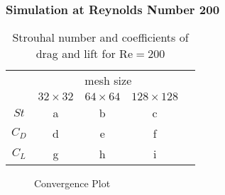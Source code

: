	\subsubsection{Simulation at Reynolds Number 200}
			\begin{table}[htp]
				\centering
				\begin{tabular}{|c||c|c|c|c}
					\cline{1-4}
					\rule{0pt}{2,3ex}\multirow{2}{*}{}   & \multicolumn{3}{c|}{mesh size} &  \\ \cline{2-4}
					\rule{0pt}{2,3ex}& $32 \times 32$       & $64 \times 64$       & $128 \times 128$      &  \\ \cline{1-4}
					\rule{0pt}{2,3ex}$St$ 				 & a        & b        & c        &  \\ \cline{1-4}
					\rule{0pt}{2,3ex}$C_D$                & d        & e        & f        &  \\ \cline{1-4}
					\rule{0pt}{2,3ex}$C_L$                & g        & h        & i        &  \\ \cline{1-4}
				\end{tabular}
				\caption{Strouhal number and coefficients of drag and lift for $\text{Re}=200$}
				\label{tab:re200}
			\end{table}
			\begin{figure}[htp]	
				\centering
				\label{shijfterdaror}	
				\caption{Convergence Plot}
			\end{figure}